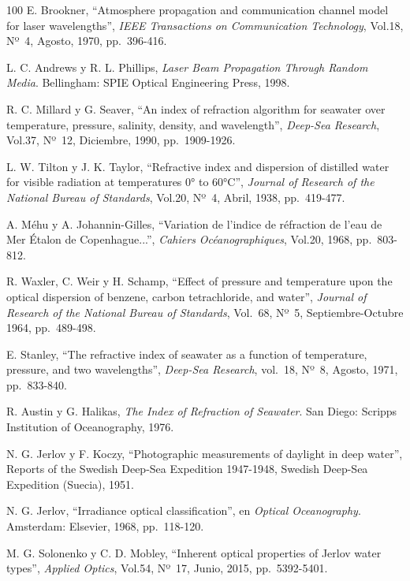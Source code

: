 \begin{thebibliography}{100}
E. Brookner,
``Atmosphere propagation and communication channel model for laser wavelengths'',
\textit{IEEE Transactions on Communication Technology},
Vol.18, Nº~4, Agosto, 1970, pp.~396-416.

L. C. Andrews y R. L. Phillips,
\textit{Laser Beam Propagation Through Random Media}.
Bellingham: SPIE Optical Engineering Press, 1998.

R. C. Millard y G. Seaver,
``An index of refraction algorithm for seawater over temperature, pressure, salinity, density, and wavelength'',
\textit{Deep-Sea Research},
Vol.37, Nº~12, Diciembre, 1990, pp.~1909-1926.

L. W. Tilton y J. K. Taylor,
``Refractive index and dispersion of distilled water for visible radiation at temperatures 0° to 60°C'',
\textit{Journal of Research of the National Bureau of Standards},
Vol.20, Nº~4, Abril, 1938, pp.~419-477.

A. Méhu y A. Johannin-Gilles,
``Variation de l’indice de réfraction de l’eau de Mer Étalon de Copenhague...'',
\textit{Cahiers Océanographiques},
Vol.20, 1968, pp.~803-812.

R. Waxler, C. Weir y H. Schamp,
``Effect of pressure and temperature upon the optical dispersion of benzene, carbon tetrachloride, and water'',
\textit{Journal of Research of the National Bureau of Standards},
Vol.~68, Nº~5, Septiembre-Octubre 1964, pp.~489-498.

E. Stanley,
``The refractive index of seawater as a function of temperature, pressure, and two wavelengths'',
\textit{Deep-Sea Research},
vol.~18, Nº~8, Agosto, 1971, pp.~833-840.

R. Austin y G. Halikas,
\textit{The Index of Refraction of Seawater}.
San Diego: Scripps Institution of Oceanography, 1976.

N. G. Jerlov y F. Koczy,
``Photographic measurements of daylight in deep water'',
Reports of the Swedish Deep-Sea Expedition 1947-1948, Swedish Deep-Sea Expedition (Suecia), 1951.

N. G. Jerlov,
``Irradiance optical classification'',
en \textit{Optical Oceanography}.
Amsterdam: Elsevier, 1968, pp.~118-120.

M. G. Solonenko y C. D. Mobley,
``Inherent optical properties of Jerlov water types'',
\textit{Applied Optics},
Vol.54, Nº~17, Junio, 2015, pp.~5392-5401.


\end{thebibliography}
